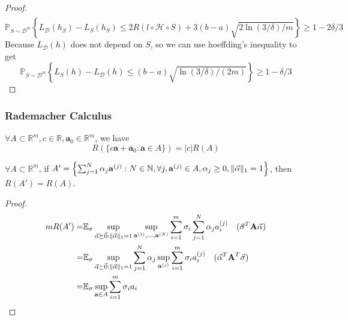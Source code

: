 \begin{theorem}
\begin{enumerate}
\begin{proof}
\begin{align*}
                \end{align*}
            \[
                \mathbb{P} _{S \sim \mathcal{D}^m} \left\{ L_ \mathcal{D}(h_S) - L_S (h_S) \le 2 R( l\circ \mathcal{H}\circ S) + 3(b-a) \sqrt{2 \ln(3/\delta)/m} \right\} \ge 1-2\delta/3
            \]
            Because $ L_ \mathcal{D}(h) $ does not depend on $ S $, so we can use hoeffding's inequality to get 
            \[
                \mathbb{P} _{S \sim \mathcal{D}^m} \left\{ L_S(h) - L_ \mathcal{D}(h) \le (b-a) \sqrt{ {\ln(3/\delta)}/{(2m)} } \right\} \ge 1-\delta/3
            \]
            \end{proof}
    \end{enumerate}
\end{theorem}

\subsubsection{Rademacher Calculus}%
\label{sub:rademacher_calculus}

\begin{lemma}
    $ \forall A \subset \mathbb{R}^m, c \in \mathbb{R}, \mathbf{a}_0 \in \mathbb{R}^m $, we have
    \begin{equation}
        R( \{ c \mathbf{a}+ \mathbf{a}_0 : \mathbf{a} \in A \}) = |c| R(A)
    \end{equation}
\end{lemma}

\begin{lemma}
    $ \forall A \subset \mathbb{R}^m $, if $ A' = \left\{ \sum^{N}_{j=1} \alpha_j \mathbf{a}^{(j)} : N \in \mathbb{N}, \forall j, \mathbf{a}^{(j)} \in A, \alpha_j \ge 0, \Arrowvert \vec{\alpha} \Arrowvert_1 = 1 \right\} $, then $ R(A') = R(A) $. 
    \begin{proof}
        \begin{align*}
            m R(A') =& \mathbb{E}_\sigma \sup_{\vec \alpha \succeq \vec 0 : \Arrowvert \vec \alpha \Arrowvert_1 = 1}
            \sup_{\mathbf{a}^{(1)}, \ldots, \mathbf{a}^{(N)}} \sum^{m}_{i=1} \sigma_i \sum^{N}_{j=1} \alpha_j a_i^{(j)} \quad (\vec{\sigma}^T \mathbf{A} \vec{\alpha})\\
            =& \mathbb{E}_\sigma \sup_{\vec \alpha \succeq \vec 0 : \Arrowvert \vec \alpha \Arrowvert_1 = 1}\sum^{N}_{j=1} \alpha_j \sup_{\mathbf{a}^{(j)}} \sum^{m}_{i=1} \sigma_i a_i^{(j)} \quad (\vec{\alpha}^T \mathbf{A}^T \vec{\sigma})\\
            =& \mathbb{E}_\sigma \sup_{\mathbf{a}\in A} \sum^{m}_{i=1} \sigma_i a_i
        \end{align*}
    \end{proof}
\end{lemma}

